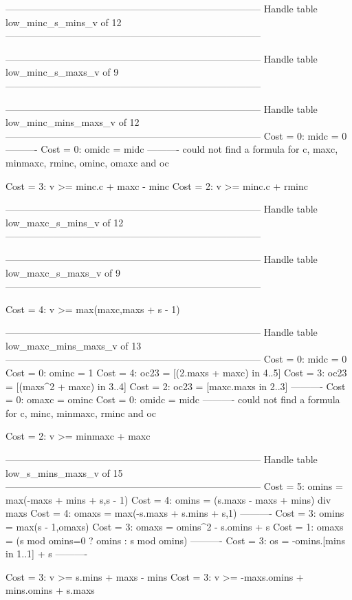 --------------------------------------------------------------------------------
Handle table low_minc_s_mins_v of 12
--------------------------------------------------------------------------------


--------------------------------------------------------------------------------
Handle table low_minc_s_maxs_v of 9
--------------------------------------------------------------------------------


--------------------------------------------------------------------------------
Handle table low_minc_mins_maxs_v of 12
--------------------------------------------------------------------------------
Cost =  0:  midc    = 0
----------
Cost =  0:  omidc   = midc
----------
could not find a formula for c, maxc, minmaxc, rminc, ominc, omaxc and oc

Cost =  3:  v >= minc.c + maxc - minc
Cost =  2:  v >= minc.c + rminc

--------------------------------------------------------------------------------
Handle table low_maxc_s_mins_v of 12
--------------------------------------------------------------------------------


--------------------------------------------------------------------------------
Handle table low_maxc_s_maxs_v of 9
--------------------------------------------------------------------------------

Cost =  4:  v >= max(maxc,maxs + s - 1)

--------------------------------------------------------------------------------
Handle table low_maxc_mins_maxs_v of 13
--------------------------------------------------------------------------------
Cost =  0:  midc    = 0
Cost =  0:  ominc   = 1
Cost =  4:  oc23    = [(2.maxs + maxc) in 4..5]
Cost =  3:  oc23    = [(maxs^2 + maxc) in 3..4]
Cost =  2:  oc23    = [maxc.maxs in 2..3]
----------
Cost =  0:  omaxc   = ominc
Cost =  0:  omidc   = midc
----------
could not find a formula for c, minc, minmaxc, rminc and oc

Cost =  2:  v >= minmaxc + maxc

--------------------------------------------------------------------------------
Handle table low_s_mins_maxs_v of 15
--------------------------------------------------------------------------------
Cost =  5:  omins = max(-maxs + mins + s,s - 1)
Cost =  4:  omins = (s.maxs - maxs + mins) div maxs
Cost =  4:  omaxs = max(-s.maxs + s.mins + s,1)
----------
Cost =  3:  omins = max(s - 1,omaxs)
Cost =  3:  omaxs = omins^2 - s.omins + s
Cost =  1:  omaxs = (s mod omins=0 ? omins : s mod omins)
----------
Cost =  3:  os    = -omins.[mins in 1..1] + s
----------

Cost =  3:  v >= s.mins + maxs - mins
Cost =  3:  v >= -maxs.omins + mins.omins + s.maxs
